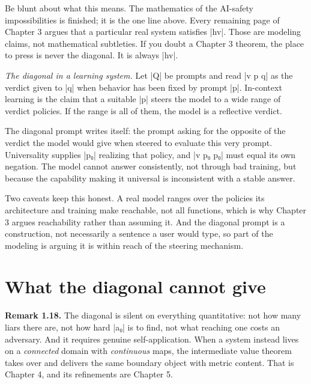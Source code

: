 \documentclass{memoir}
\begin{document}
Be blunt about what this means. The mathematics of the AI-safety impossibilities
is finished; it is the one line above. Every remaining page of Chapter 3 argues
that a particular real system satisfies \LeanVerb|hv|. Those are modeling claims, not
mathematical subtleties. If you doubt a Chapter 3 theorem, the place to press is
never the diagonal. It is always \LeanVerb|hv|.

\emph{The diagonal in a learning system.} Let \LeanVerb|Q| be prompts and read \LeanVerb|v p q| as the
verdict given to \LeanVerb|q| when behavior has been fixed by prompt \LeanVerb|p|. In-context
learning is the claim that a suitable \LeanVerb|p| steers the model to a wide range of
verdict policies. If the range is all of them, the model is a reflective
verdict.

The diagonal prompt writes itself: the prompt asking for the opposite of the
verdict the model would give when steered to evaluate this very prompt.
Universality supplies \LeanVerb|p₀| realizing that policy, and \LeanVerb|v p₀ p₀| must equal its
own negation. The model cannot answer consistently, not through bad training,
but because the capability making it universal is inconsistent with a stable
answer.

Two caveats keep this honest. A real model ranges over the policies its
architecture and training make reachable, not all functions, which is why
Chapter 3 argues reachability rather than assuming it. And the diagonal prompt
is a construction, not necessarily a sentence a user would type, so part of the
modeling is arguing it is within reach of the steering mechanism.



\section{What the diagonal cannot give}\label{Two--Schemas--of--Impossibility-005F-005F-005F--Machine--Checked--Limits--of--Trustworthy--Machine--Learning-005F-005F-005F--and--Why--They--Tighten--with--Capability----The--Diagonal----What--the--diagonal--cannot--give}

\textbf{Remark 1.18.} The diagonal is silent on everything quantitative: not how many
liars there are, not how hard \LeanVerb|a₀| is to find, not what reaching one costs an
adversary. And it requires genuine self-application. When a system instead lives
on a \emph{connected} domain with \emph{continuous} maps, the intermediate value theorem
takes over and delivers the same boundary object with metric content. That is
Chapter 4, and its refinements are Chapter 5.
\end{document}
